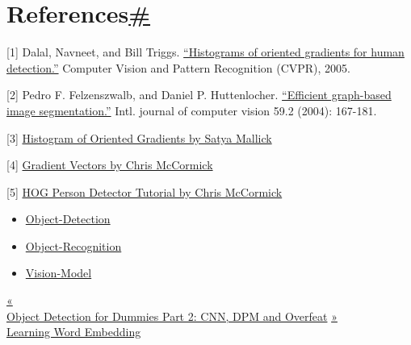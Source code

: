 \section{\texorpdfstring{References\hyperref[references]{\#}}{References\#}}\label{references}

{[}1{]} Dalal, Navneet, and Bill Triggs. \href{https://hal.inria.fr/file/index/docid/548512/filename/hog_cvpr2005.pdf}{``Histograms of oriented gradients for human detection.''} Computer Vision and Pattern Recognition (CVPR), 2005.

{[}2{]} Pedro F. Felzenszwalb, and Daniel P. Huttenlocher. \href{http://cvcl.mit.edu/SUNSeminar/Felzenszwalb_IJCV04.pdf}{``Efficient graph-based image segmentation.''} Intl. journal of computer vision 59.2 (2004): 167-181.

{[}3{]} \href{https://www.learnopencv.com/histogram-of-oriented-gradients/}{Histogram of Oriented Gradients by Satya Mallick}

{[}4{]} \href{http://mccormickml.com/2013/05/07/gradient-vectors/}{Gradient Vectors by Chris McCormick}

{[}5{]} \href{http://mccormickml.com/2013/05/09/hog-person-detector-tutorial/}{HOG Person Detector Tutorial by Chris McCormick}

\begin{itemize}
\tightlist
\item
  \href{https://lilianweng.github.io/tags/object-detection/}{Object-Detection}
\item
  \href{https://lilianweng.github.io/tags/object-recognition/}{Object-Recognition}
\item
  \href{https://lilianweng.github.io/tags/vision-model/}{Vision-Model}
\end{itemize}

\href{https://lilianweng.github.io/posts/2017-12-15-object-recognition-part-2/}{{« }\\
{Object Detection for Dummies Part 2: CNN, DPM and Overfeat}} \href{https://lilianweng.github.io/posts/2017-10-15-word-embedding/}{{ »}\\
{Learning Word Embedding}}

